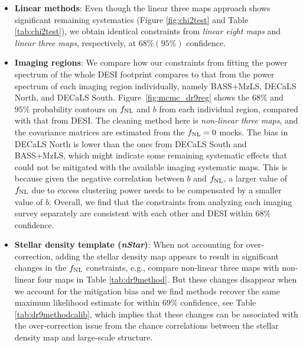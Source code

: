 \begin{itemize}[itemindent=*]

\item \textbf{Linear methods}: Even though the linear three maps approach shows significant remaining systematics (Figure \ref{fig:chi2test} and Table \ref{tab:chi2test}), we obtain identical constraints from \textit{linear eight maps} and \textit{linear three maps}, respectively,  at $68\%(95\%)$ confidence. 

\item \textbf{Imaging regions}: We compare how our constraints from fitting the power spectrum of the whole DESI footprint compares to that from the power spectrum of each imaging region individually, namely BASS+MzLS, DECaLS North, and DECaLS South. Figure~\ref{fig:mcmc_dr9reg} shows the $68\%$ and $95\%$ probability contours on $f_{\rm NL}$ and $b$ from each individual region, compared with that from DESI. The cleaning method here is \textit{non-linear three maps}, and the covariance matrices are estimated from the $f_{\rm NL}=0$ mocks. The bias in DECaLS North is lower than the ones from DECaLS South and BASS+MzLS, which might indicate some remaining systematic effects that could not be mitigated with the available imaging systematic maps. This is because given the negative correlation between $b$ and $f_{\rm NL}$, a larger value of $f_{\rm NL}$ due to excess clustering power needs to be compensated by a smaller value of $b$. Overall, we find that the constraints from analyzing each imaging survey separately are consistent with each other and DESI within $68\%$ confidence. 

\item \textbf{Stellar density template (\textit{nStar})}: When not accounting for over-correction, adding the stellar density map appears to result in significant changes in the $f_{\rm NL}$ constraints, e.g., compare non-linear three maps with non-linear four maps in Table \ref{tab:dr9method}. But these changes disappear when we account for the mitigation bias and we find  methods recover the same maximum likelihood estimate for  within $69\%$ confidence, see Table \ref{tab:dr9methodcalib}, which implies that these changes can be associated with the over-correction issue from the chance correlations between the stellar density map and large-scale structure.


\end{itemize}
